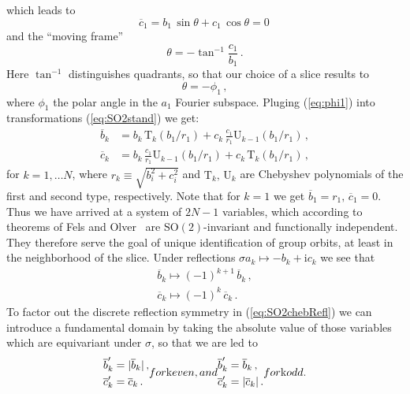 \documentclass[aip,cha,showpacs,twocolumn,
 		  reprint]{revtex4-1} %
\newcommand{\beq}{\begin{equation}}
\newcommand{\eeq}{\end{equation}}
\newcommand{\bseq}{\begin{subequations}}
\newcommand{\eseq}{\end{subequations}}
\newcommand{\rf}     [1] {~\cite{#1}}
\newcommand{\refeq}  [1] {(\ref{#1})}
\newcommand{\SOn}[1]{\ensuremath{\textrm{SO}(#1)}}         %
\newcommand{\Refl}{\ensuremath{\sigma}}
\newcommand{\chebT}{\mathrm{T}}
\newcommand{\chebU}{\mathrm{U}}
\newcommand{\ii}{\ensuremath{\mathrm{i}}} %
\begin{document}
which leads to
\beq
	\overline{c}_1 = b_1\,\sin\theta + c_1\,\cos\theta  = 0\,
	\label{eq:SO2norm}
\eeq
and the ``moving frame''
\beq
	\theta=-\tan^{-1}\frac{c_1}{b_1}\,.
	\label{eq:SO2mf}
\eeq
Here $\tan^{-1}$ distinguishes quadrants, so that our choice of a slice
results to
\beq\label{eq:phi1}
  \theta=-\phi_1\,,
\eeq
where $\phi_1$ the polar angle in the $a_1$ Fourier
subspace. Pluging \refeq{eq:phi1} into
transformations \refeq{eq:SO2stand} we get:
\bseq\label{eq:SO2cheb}
  \begin{align}
    \overline{b}_k &=
		    b_k\, \chebT_k\left(b_1/r_1\right)+
		    c_k\,\frac{c_1}{r_1} \chebU_{k-1}\left(b_1/r_1\right)\,, \label{eq:SO2cheb1}\\
    \overline{c}_k &=
		    b_k\, \frac{c_1}{r_1} \chebU_{k-1}\left(b_1/r_1\right)+
		    c_k\,\chebT_k\left(b_1/r_1\right)\,,  \label{eq:SO2cheb2}
  \end{align}
\eseq
for $k=1,\ldots N$, where $r_k\equiv\sqrt{b_i^2+c_i^2}$ and $\chebT_k,\,\chebU_k$
are Chebyshev polynomials of the first and second type, respectively.
Note that for $k=1$ we get $\overline{b}_1=r_1,\, \overline{c}_1=0$.
Thus we have arrived at a system of $2N-1$ variables, which according to
theorems of Fels and Olver\rf{FelsOlver98,FelsOlver99} are
$\SOn{2}$-invariant and functionally independent. They therefore serve the goal
of unique identification of group orbits, at least in the neighborhood of the
slice. Under reflections $\Refl a_k \mapsto-b_k+\ii c_k$ we see that
\bseq\label{eq:SO2chebRefl}
 \begin{align}
  \overline{b}_k \mapsto (-1)^{k+1}\, \overline{b}_k\,,\\
  \overline{c}_k \mapsto (-1)^{k}\, \overline{c}_k\,.
 \end{align}
\eseq
 To factor out the discrete reflection symmetry in \refeq{eq:SO2chebRefl} we can
introduce a fundamental domain by taking the absolute value of those variables
which are equivariant under $\Refl$, so that we are led to
\bseq\label{eq:O2cheb}
  \begin{align}
    \overline{b}'_k &=
		    |\overline{b}_k|\,, \\
    \overline{c}'_k &=
		    \overline{c}_k\,.
  \end{align}
for $k$ even, and
  \begin{align}
    \overline{b}'_k &=
		    \overline{b}_k\,, \\
    \overline{c}'_k &=
		    |\overline{c}_k|\,.
  \end{align}
for $k$ odd.
\eseq
\end{document}

